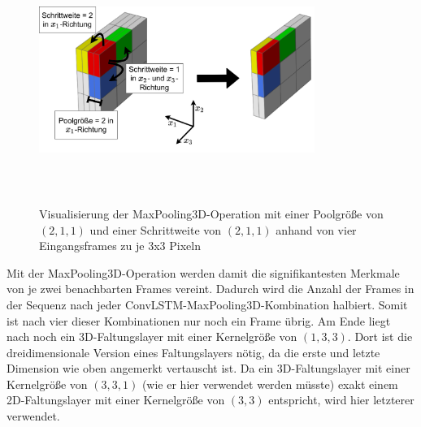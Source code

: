 \begin{figure}[ht!]
    \centering
    \includegraphics[width=0.8\textwidth,height=8cm,keepaspectratio=true]{content/images/MaxPooling3D.jpeg}
    \caption{Visualisierung der MaxPooling3D-Operation mit einer Poolgröße von $(2, 1, 1)$ und einer Schrittweite von $(2, 1, 1)$ anhand von vier Eingangsframes zu je 3x3 Pixeln}
    \label{fig:MaxPooling3D}
\end{figure}

Mit der MaxPooling3D-Operation werden damit die signifikantesten Merkmale von je zwei benachbarten Frames vereint.
Dadurch wird die Anzahl der Frames in der Sequenz nach jeder ConvLSTM-MaxPooling3D-Kombination halbiert.
Somit ist nach vier dieser Kombinationen nur noch ein Frame übrig.
Am Ende liegt nach \cite{CrimeConvLSTM} noch ein 3D-Faltungslayer mit einer Kernelgröße von $(1, 3, 3)$.
Dort ist die dreidimensionale Version eines Faltungslayers nötig, da die erste und letzte Dimension wie oben angemerkt vertauscht ist.
Da ein 3D-Faltungslayer mit einer Kernelgröße von $(3, 3, 1)$ (wie er hier verwendet werden müsste) exakt einem 2D-Faltungslayer mit einer Kernelgröße von $(3, 3)$ entspricht, wird hier letzterer verwendet.

